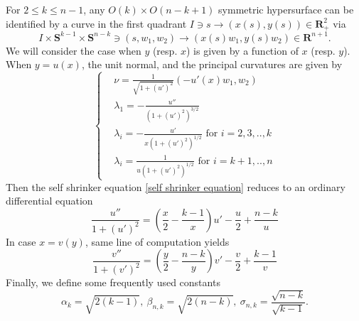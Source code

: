 \documentclass[pdflatex,sn-mathphys-num]{sn-jnl}
\begin{document}
For $2 \leq k \leq n-1$, any $O(k) \times O(n-k+1)$ symmetric hypersurface can be identified by a curve in the first quadrant $I \ni s \to (x(s), y(s)) \in \mathbf{R}_+^2$ via
\begin{equation}
     I \times \mathbf{S}^{k-1}  \times \mathbf{S}^{n-k}\ni (s, w_1, w_2) \to(x(s)w_1, y(s)w_2) \in \mathbf{R}^{n+1}.
\end{equation}
We will consider the case when $y$ (resp. $x$) is given by a function of $x$ (resp. $y$). When  $y = u(x)$, the unit normal, and the principal curvatures are given by
\begin{equation}\label{geometric quantities calculation}
    \begin{cases}
    &\nu = \frac{1}{\sqrt{1 + (u')^2}}(-u'(x)w_1, w_2) \\ & \lambda_1 = -\frac{u''}{(1 + (u')^2)^{3/2}}  \\ &\lambda_i = -\frac{u'}{x(1 + (u')^2)^{1/2}} \text{ for }i = 2,3,..,k  \\ & \lambda_i = \frac{1}{u(1 + (u')^2)^{1/2}} \text{ for }i = k+1,..,n
\end{cases}
\end{equation}
Then the self shrinker equation \eqref{self shrinker equation} reduces to an ordinary differential equation
\begin{equation}
    \frac{u''}{1 + (u')^2} = (\frac{x}{2} - \frac{k-1}{x})u' - \frac{u}{2} + \frac{n-k}{u}\label{Main ODE y = u(x)}
\end{equation}
In case $x = v(y)$, same line of computation yields
\begin{equation}
    \frac{v''}{1 + (v')^2} = (\frac{y}{2} - \frac{n-k}{y})v' - \frac{v}{2} + \frac{k-1}{v}\label{Main ODE x = v(y)}
\end{equation}
Finally, we define some frequently used constants
\begin{equation}\label{frequently used constants}
    \alpha_{k} = \sqrt{2(k-1)}, \ \beta_{n,k} = \sqrt{2(n-k)}, \ \sigma_{n,k} = \frac{\sqrt{n-k}}{\sqrt{k-1}}. 
\end{equation}
\end{document}

